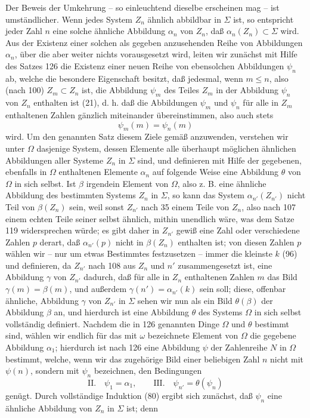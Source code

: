 \documentclass[11pt]{article}
\newcommand{\partof}{\mathrel{\subset}}
\begin{document}
Der Beweis der Umkehrung -- so einleuchtend dieselbe erscheinen mag -- ist umständlicher. Wenn jedes System $Z_n$ ähnlich abbildbar in $\Sigma$ ist, so entspricht jeder Zahl $n$ eine solche ähnliche Abbildung $\alpha_n$ von $Z_n$, daß $\alpha_n(Z_n)\partof\Sigma$ wird. Aus der Existenz einer solchen als gegeben anzusehenden Reihe von Abbildungen $\alpha_n$, über die aber weiter nichts vorausgesetzt wird, leiten wir zunächst mit Hilfe des Satzes 126 die Existenz einer neuen Reihe von ebensolchen Abbildungen $\psi_n$ ab, welche die besondere Eigenschaft besitzt, daß jedesmal, wenn $m\leq n$, also (nach 100) $Z_m\partof Z_n$ ist, die Abbildung $\psi_m$ des Teiles $Z_m$ in der Abbildung $\psi_n$ von $Z_n$ enthalten ist (21), d. h. daß die Abbildungen $\psi_m$ und $\psi_n$ für alle in $Z_m$ enthaltenen Zahlen gänzlich miteinander übereinstimmen, also auch stets
\[
\psi_m(m)=\psi_n(m)
\]
wird. Um den genannten Satz diesem Ziele gemäß anzuwenden, verstehen wir unter $\Omega$ dasjenige System, dessen Elemente alle überhaupt möglichen ähnlichen Abbildungen aller Systeme $Z_n$ in $\Sigma$ sind, und definieren mit Hilfe der gegebenen, ebenfalls in $\Omega$ enthaltenen Elemente $\alpha_n$ auf folgende Weise eine Abbildung $\theta$ von $\Omega$ in sich selbst. Ist $\beta$ irgendein Element von $\Omega$, also z. B. eine ähnliche Abbildung des bestimmten Systems $Z_n$ in $\Sigma$, so kann das System $\alpha_{n'}(Z_{n'})$ nicht Teil von $\beta(Z_n)$ sein, weil sonst $Z_{n'}$ nach 35 einem Teile von $Z_n$, also nach 107 einem echten Teile seiner selbst ähnlich, mithin unendlich wäre, was dem Satze 119 widersprechen würde; es gibt daher in $Z_{n'}$ gewiß eine Zahl oder verschiedene Zahlen $p$ derart, daß $\alpha_{n'}(p)$ nicht in $\beta(Z_n)$ enthalten ist; von diesen Zahlen $p$ wählen wir -- nur um etwas Bestimmtes festzusetzen -- immer die kleinste $k$ (96) und definieren, da $Z_{n'}$ nach 108 aus $Z_n$ und $n'$ zusammengesetzt ist, eine Abbildung $\gamma$ von $Z_{n'}$ dadurch, daß für alle in $Z_n$ enthaltenen Zahlen $m$ das Bild $\gamma(m)=\beta(m)$, und außerdem $\gamma(n')=\alpha_{n'}(k)$ sein soll; diese, offenbar ähnliche, Abbildung $\gamma$ von $Z_{n'}$ in $\Sigma$ sehen wir nun als ein Bild $\theta(\beta)$ der Abbildung $\beta$ an, und hierdurch ist eine Abbildung $\theta$ des Systems $\Omega$ in sich selbst vollständig definiert. Nachdem die in 126 genannten Dinge $\Omega$ und $\theta$ bestimmt sind, wählen wir endlich für das mit $\omega$ bezeichnete Element von $\Omega$ die gegebene Abbildung $\alpha_1$; hierdurch ist nach 126 eine Abbildung $\psi$ der Zahlenreihe $N$ in $\Omega$ bestimmt, welche, wenn wir das zugehörige Bild einer beliebigen Zahl $n$ nicht mit $\psi(n)$, sondern mit $\psi_n$ bezeichnen, den Bedingungen
\[
\text{II.}\quad \psi_1=\alpha_1,
\qquad
\text{III.}\quad \psi_{n'}=\theta(\psi_n)
\]
genügt. Durch vollständige Induktion (80) ergibt sich zunächst, daß $\psi_n$ eine ähnliche Abbildung von $Z_n$ in $\Sigma$ ist; denn
\end{document}
